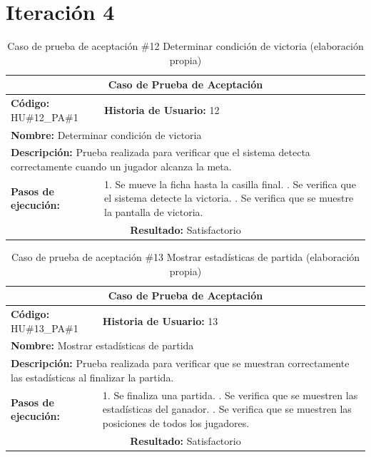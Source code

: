 \section*{Iteración 4}

\begin{table}[H]
\centering
\caption{Caso de prueba de aceptación \#12 Determinar condición de victoria (elaboración propia)\label{tab:cpa12}}
\renewcommand{\arraystretch}{1.3}
\begin{tabular}{|p{}|p{}|}
\hline
\multicolumn{2}{|c|}{\textbf{Caso de Prueba de Aceptación}} \\
\hline
\textbf{Código:} HU\#12\_PA\#1 & \textbf{Historia de Usuario:} 12 \\
\hline
\multicolumn{2}{|l|}{\textbf{Nombre:} Determinar condición de victoria} \\
\hline
\multicolumn{2}{|p{0.9\textwidth}|}{\textbf{Descripción:} Prueba realizada para verificar que el sistema detecta correctamente cuando un jugador alcanza la meta.} \\
\hline
\textbf{Pasos de ejecución:} & 1. Se mueve la ficha hasta la casilla final. \newline 2. Se verifica que el sistema detecte la victoria. \newline 3. Se verifica que se muestre la pantalla de victoria. \\
\hline
\multicolumn{2}{|c|}{\textbf{Resultado:} Satisfactorio} \\
\hline
\end{tabular}
\end{table}

\begin{table}[H]
\centering
\caption{Caso de prueba de aceptación \#13 Mostrar estadísticas de partida (elaboración propia)\label{tab:cpa13}}
\renewcommand{\arraystretch}{1.3}
\begin{tabular}{|p{}|p{}|}
\hline
\multicolumn{2}{|c|}{\textbf{Caso de Prueba de Aceptación}} \\
\hline
\textbf{Código:} HU\#13\_PA\#1 & \textbf{Historia de Usuario:} 13 \\
\hline
\multicolumn{2}{|l|}{\textbf{Nombre:} Mostrar estadísticas de partida} \\
\hline
\multicolumn{2}{|p{0.9\textwidth}|}{\textbf{Descripción:} Prueba realizada para verificar que se muestran correctamente las estadísticas al finalizar la partida.} \\
\hline
\textbf{Pasos de ejecución:} & 1. Se finaliza una partida. \newline 2. Se verifica que se muestren las estadísticas del ganador. \newline 3. Se verifica que se muestren las posiciones de todos los jugadores. \\
\hline
\multicolumn{2}{|c|}{\textbf{Resultado:} Satisfactorio} \\
\hline
\end{tabular}
\end{table}

